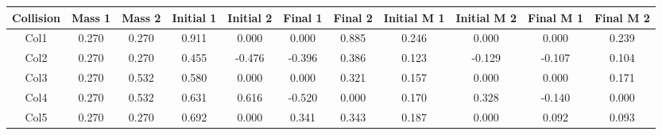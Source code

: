 \begin{table}[]
  \begin{tabular}{@{}ccccccccccc@{}}
  \toprule
  Collision & Mass 1 & Mass 2 & Initial 1 & Initial 2 & Final 1 & Final 2 & Initial M 1 & Initial M 2 & Final M 1 & Final M 2 \\ \midrule
  Col1      & 0.270  & 0.270  & 0.911     & 0.000     & 0.000   & 0.885   & 0.246       & 0.000       & 0.000     & 0.239     \\
  Col2      & 0.270  & 0.270  & 0.455     & -0.476    & -0.396  & 0.386   & 0.123       & -0.129      & -0.107    & 0.104     \\
  Col3      & 0.270  & 0.532  & 0.580     & 0.000     & 0.000   & 0.321   & 0.157       & 0.000       & 0.000     & 0.171     \\
  Col4      & 0.270  & 0.532  & 0.631     & 0.616     & -0.520  & 0.000   & 0.170       & 0.328       & -0.140    & 0.000     \\
  Col5      & 0.270  & 0.270  & 0.692     & 0.000     & 0.341   & 0.343   & 0.187       & 0.000       & 0.092     & 0.093     \\ \bottomrule
  \end{tabular}
  \end{table}